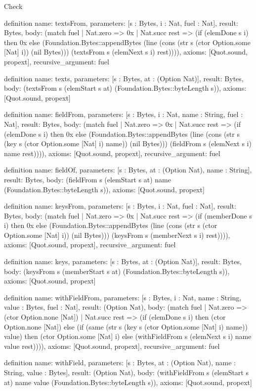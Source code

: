 \begin{lexlean}{Check}
\begin{semanticmodule}
definition{
  name: textsFrom,
  parameters: [s : Bytes, i : Nat, fuel : Nat],
  result: Bytes,
  body: (match fuel
    | Nat.zero => 0x
    | Nat.succ rest => (if (elemDone s i) then 0x else (Foundation.Bytes::appendBytes (line (cons (str s (ctor Option.some [Nat] i)) (nil Bytes))) (textsFrom s (elemNext s i) rest)))),
  axioms: [Quot.sound, propext],
  recursive_argument: fuel
}

definition{
  name: texts,
  parameters: [s : Bytes, at : (Option Nat)],
  result: Bytes,
  body: (textsFrom s (elemStart s at) (Foundation.Bytes::byteLength s)),
  axioms: [Quot.sound, propext]
}

definition{
  name: fieldFrom,
  parameters: [s : Bytes, i : Nat, name : String, fuel : Nat],
  result: Bytes,
  body: (match fuel
    | Nat.zero => 0x
    | Nat.succ rest => (if (elemDone s i) then 0x else (Foundation.Bytes::appendBytes (line (cons (str s (key s (ctor Option.some [Nat] i) name)) (nil Bytes))) (fieldFrom s (elemNext s i) name rest)))),
  axioms: [Quot.sound, propext],
  recursive_argument: fuel
}

definition{
  name: fieldOf,
  parameters: [s : Bytes, at : (Option Nat), name : String],
  result: Bytes,
  body: (fieldFrom s (elemStart s at) name (Foundation.Bytes::byteLength s)),
  axioms: [Quot.sound, propext]
}

definition{
  name: keysFrom,
  parameters: [s : Bytes, i : Nat, fuel : Nat],
  result: Bytes,
  body: (match fuel
    | Nat.zero => 0x
    | Nat.succ rest => (if (memberDone s i) then 0x else (Foundation.Bytes::appendBytes (line (cons (str s (ctor Option.some [Nat] i)) (nil Bytes))) (keysFrom s (memberNext s i) rest)))),
  axioms: [Quot.sound, propext],
  recursive_argument: fuel
}

definition{
  name: keys,
  parameters: [s : Bytes, at : (Option Nat)],
  result: Bytes,
  body: (keysFrom s (memberStart s at) (Foundation.Bytes::byteLength s)),
  axioms: [Quot.sound, propext]
}

definition{
  name: withFieldFrom,
  parameters: [s : Bytes, i : Nat, name : String, value : Bytes, fuel : Nat],
  result: (Option Nat),
  body: (match fuel
    | Nat.zero => (ctor Option.none [Nat])
    | Nat.succ rest => (if (elemDone s i) then (ctor Option.none [Nat]) else (if (same (str s (key s (ctor Option.some [Nat] i) name)) value) then (ctor Option.some [Nat] i) else (withFieldFrom s (elemNext s i) name value rest)))),
  axioms: [Quot.sound, propext],
  recursive_argument: fuel
}

definition{
  name: withField,
  parameters: [s : Bytes, at : (Option Nat), name : String, value : Bytes],
  result: (Option Nat),
  body: (withFieldFrom s (elemStart s at) name value (Foundation.Bytes::byteLength s)),
  axioms: [Quot.sound, propext]
}
\end{semanticmodule}
\end{lexlean}

